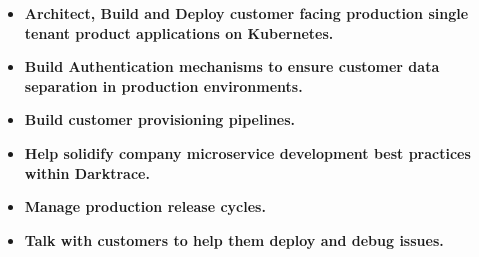\documentclass[10pt,a4paper]{altacv}
\begin{document}
\divider

\begin{itemize}
\item \textbf{Architect, Build and Deploy customer facing production single tenant product applications on Kubernetes.}
\item \textbf{Build Authentication mechanisms to ensure customer data separation in production environments.}
\item \textbf{Build customer provisioning pipelines.}
\item \textbf{Help solidify company microservice development best practices within Darktrace.}
\item \textbf{Manage production release cycles.}
\item \textbf{Talk with customers to help them deploy and debug issues.}
\end{itemize}

\divider
  
\end{document}
